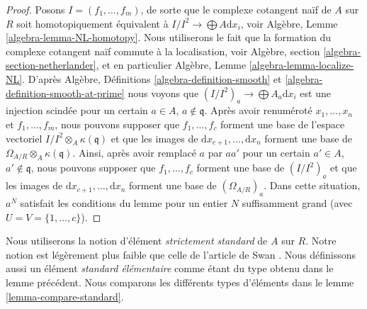 \begin{proof}
Posons $I = (f_1, \ldots, f_m)$, de sorte que le complexe cotangent naïf de
$A$ sur $R$ soit homotopiquement équivalent à
$I/I^2 \to \bigoplus A\text{d}x_i$, voir
Algèbre, Lemme \ref{algebra-lemma-NL-homotopy}.
Nous utiliserons le fait que la formation du complexe cotangent naïf commute à
la localisation, voir Algèbre, section \ref{algebra-section-netherlander},
et en particulier Algèbre, Lemme \ref{algebra-lemma-localize-NL}.
D'après Algèbre, Définitions \ref{algebra-definition-smooth} et
\ref{algebra-definition-smooth-at-prime}
nous voyons que $(I/I^2)_a \to \bigoplus A_a\text{d}x_i$ est une injection
scindée pour un certain $a \in A$, $a \not \in \mathfrak q$.
Après avoir renuméroté $x_1, \ldots, x_n$ et $f_1, \ldots, f_m$, nous pouvons
supposer que $f_1, \ldots, f_c$ forment une base de l'espace vectoriel
$I/I^2 \otimes_A \kappa(\mathfrak q)$ et que les images de
$\text{d}x_{c + 1}, \ldots, \text{d}x_n$ forment une base de
$\Omega_{A/R} \otimes_A \kappa(\mathfrak q)$. Ainsi, après avoir remplacé $a$
par $aa'$ pour un certain $a' \in A$, $a' \not \in \mathfrak q$, nous pouvons
supposer que $f_1, \ldots, f_c$ forment une base de $(I/I^2)_a$ et que les images
de $\text{d}x_{c + 1}, \ldots, \text{d}x_n$ forment une base de
$(\Omega_{A/R})_a$. Dans cette situation, $a^N$ satisfait les conditions du
lemme pour un entier $N$ suffisamment grand (avec $U = V = \{1, \ldots, c\}$).
\end{proof}

\noindent
Nous utiliserons la notion d'élément {\it strictement standard} de $A$ sur $R$.
Notre notion est légèrement plus faible que celle de l'article de Swan
\cite{swan}. Nous définissons aussi un élément {\it standard élémentaire}
comme étant du type obtenu dans le lemme précédent. Nous comparons les
différents types d'éléments dans le lemme \ref{lemma-compare-standard}.

